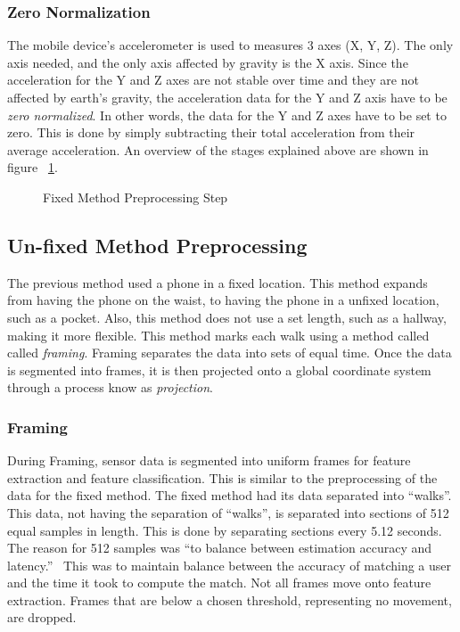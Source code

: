 \documentclass{sig-alternate}
\begin{document}
\subsubsection{Zero Normalization}
	The mobile device's accelerometer is used to measures 3 axes (X, Y, Z). The only axis needed, and the only axis affected by gravity is the X axis. Since the acceleration for the Y and Z axes are not stable over time and they are not affected by earth's gravity, the acceleration data for the Y and Z axis have to be \textit{zero normalized}. In other words, the data for the Y and Z axes have to be set to zero. This is done by simply subtracting their total acceleration from their average acceleration. An overview of the stages explained above are shown in figure ~\ref{fig:firstStep}.
	
\begin{figure}
\centering
{}
\caption{Fixed Method Preprocessing Step}
\label{fig:firstStep}
\end{figure}

	
\subsection{Un-fixed Method Preprocessing}{
	The previous method used a phone in a fixed location. This method expands from having the phone on the waist, to having the phone in a unfixed location, such as a pocket. Also, this method does not use a set length, such as a hallway, making it more flexible. This method marks each walk using a method called called \textit{framing}. Framing separates the data into sets of equal time. Once the data is segmented into frames, it is then projected onto a global coordinate system through a process know as \textit{projection}.}
		
		
			
\subsubsection{Framing}{
 During Framing, sensor data is segmented into uniform frames for feature extraction and feature classification. This is similar to the preprocessing of the data for the fixed method. The fixed method had its data separated into ``walks''. This data, not having the separation of ``walks'', is separated into sections of 512 equal samples in length. This is done by separating sections every 5.12 seconds. The reason for 512 samples was ``to balance between estimation accuracy and latency.''~\cite{Lu:2014} This was to maintain balance between the accuracy of matching a user and the time it took to compute the match. Not all frames move onto feature extraction. Frames that are below a chosen threshold, representing no movement, are dropped. }
 			
\end{document}
